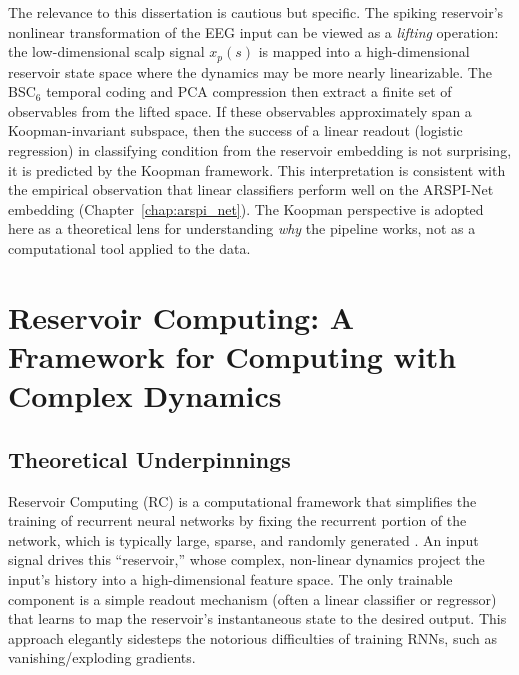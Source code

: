 The relevance to this dissertation is cautious but specific. The spiking reservoir's nonlinear transformation of the EEG input can be viewed as a \emph{lifting} operation: the low-dimensional scalp signal $x_p(s)$ is mapped into a high-dimensional reservoir state space where the dynamics may be more nearly linearizable. The BSC$_6$ temporal coding and PCA compression then extract a finite set of observables from the lifted space. If these observables approximately span a Koopman-invariant subspace, then the success of a linear readout (logistic regression) in classifying condition from the reservoir embedding is not surprising, it is predicted by the Koopman framework. This interpretation is consistent with the empirical observation that linear classifiers perform well on the ARSPI-Net embedding (Chapter~\ref{chap:arspi_net}). The Koopman perspective is adopted here as a theoretical lens for understanding \emph{why} the pipeline works, not as a computational tool applied to the data.


\section{Reservoir Computing: A Framework for Computing with Complex Dynamics}
\label{sec:reservoir_computing}

\subsection{Theoretical Underpinnings}
\label{sec:rc_theory}
Reservoir Computing (RC) is a computational framework that simplifies the training of recurrent neural networks by fixing the recurrent portion of the network, which is typically large, sparse, and randomly generated \cite{jaeger2001echo}. An input signal drives this ``reservoir,'' whose complex, non-linear dynamics project the input's history into a high-dimensional feature space. The only trainable component is a simple readout mechanism (often a linear classifier or regressor) that learns to map the reservoir's instantaneous state to the desired output. This approach elegantly sidesteps the notorious difficulties of training RNNs, such as vanishing/exploding gradients.

